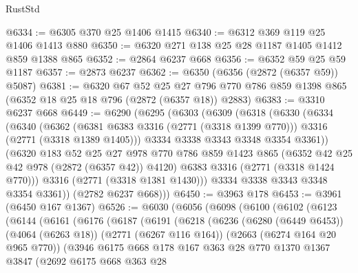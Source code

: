 \begin{lexlean}{RustStd}
\begin{coremodule}
@6334 := @6305 @370 @25 @1406 @1415
@6340 := @6312 @369 @119 @25 @1406 @1413 @880
@6350 := @6320 @271 @138 @25 @28 @1187 @1405 @1412 @859 @1388 @865
@6352 := @2864 @6237 @668
@6356 := @6352 @59 @25 @59 @1187
@6357 := @2873 @6237
@6362 := @6350 (@6356 (@2872 (@6357 @59)) @5087)
@6381 := @6320
    @67
    @52
    @25
    @27
    @796
    @770
    @786
    @859
    @1398
    @865
    (@6352 @18 @25 @18 @796 (@2872 (@6357 @18)) @2883)
@6383 := @3310 @6237 @668
@6449 := @6290
    (@6295
      (@6303
        (@6309
          (@6318
            (@6330
              (@6334
                (@6340
                  (@6362
                    (@6381 @6383 @3316 (@2771 (@3318 @1399 @770)))
                    @3316
                    (@2771 (@3318 @1389 @1405)))
                  @3334
                  @3338
                  @3343
                  @3348
                  @3354
                  @3361))
              (@6320
                @183
                @52
                @25
                @27
                @978
                @770
                @786
                @859
                @1423
                @865
                (@6352 @42 @25 @42 @978 (@2872 (@6357 @42)) @4120)
                @6383
                @3316
                (@2771 (@3318 @1424 @770)))
              @3316
              (@2771 (@3318 @1381 @1430)))
            @3334
            @3338
            @3343
            @3348
            @3354
            @3361))
        (@2782 @6237 @668)))
@6450 := @3963 @178
@6453 := @3961 (@6450 @167 @1367)
@6526 := @6030
    (@6056
      (@6098
        (@6100
          (@6102
            (@6123
              (@6144
                (@6161
                  (@6176
                    (@6187
                      (@6191
                        (@6218
                          (@6236
                            (@6280 (@6449 @6453))
                            (@4064 (@6263 @18))
                            (@2771 (@6267 @116 @164))
                            (@2663 (@6274 @164 @20 @965 @770))
                            (@3946
                              @6175
                              @668
                              @178
                              @167
                              @363
                              @28
                              @770
                              @1370
                              @1367
                              @3847
                              (@2692
                                @6175
                                @668
                                @363
                                @28

\end{coremodule}
\end{lexlean}
